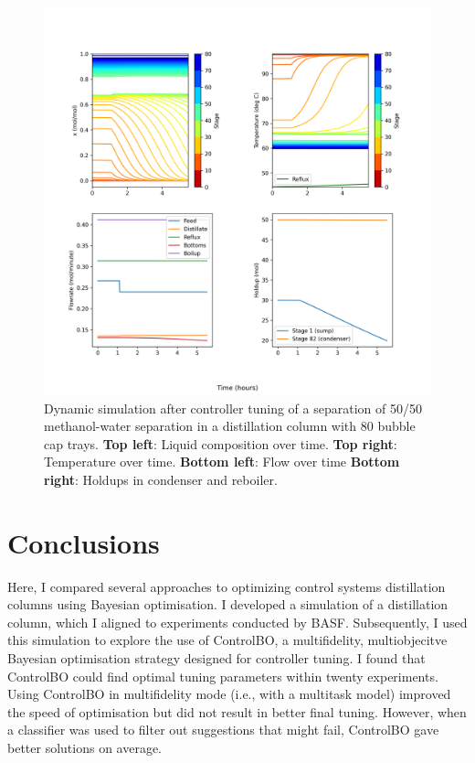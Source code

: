 \begin{figure}
    \centering
    \includegraphics[width=\textwidth]{gfx/Chapter06/mt_c_dynamic.png}
    \caption{Dynamic simulation after controller tuning of a separation of 50/50 methanol-water separation in a distillation column with 80 bubble cap trays. \textbf{Top left}: Liquid composition over time. \textbf{Top right}: Temperature over time. \textbf{Bottom left}: Flow over time \textbf{Bottom right}: Holdups in condenser and reboiler.}
    \label{fig:dynamic_after_tuning}
\end{figure}

\section{Conclusions}

Here, I compared several approaches to optimizing control systems distillation columns using Bayesian optimisation. I developed a simulation of a distillation column, which I aligned to experiments conducted by BASF. Subsequently, I used this simulation to explore the use of ControlBO, a multifidelity, multiobjecitve Bayesian optimisation strategy designed for controller tuning. I found that ControlBO could find optimal tuning parameters within twenty experiments. Using ControlBO in multifidelity mode (i.e., with a multitask model) improved the speed of optimisation but did not result in better final tuning. However, when a classifier was used to filter out suggestions that might fail, ControlBO gave better solutions on average.

